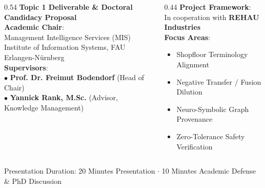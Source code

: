 \documentclass[aspectratio=169,10pt]{beamer}
\begin{document}
\begin{frame}[plain]
  \begin{columns}[T]
    \begin{column}{0.54\textwidth}
      \footnotesize
      \textbf{Topic 1 Deliverable \& Doctoral Candidacy Proposal}\\[0.4ex]
      \textbf{Academic Chair}:\\
      Management Intelligence Services (MIS)\\
      Institute of Information Systems, FAU Erlangen-N{\"u}rnberg\\[0.4ex]
      \textbf{Supervisors}:\\
      $\bullet$ \textbf{Prof. Dr. Freimut Bodendorf} (Head of Chair)\\
      $\bullet$ \textbf{Yannick Rank, M.Sc.} (Advisor, Knowledge Management)
    \end{column}
    \begin{column}{0.44\textwidth}
      \footnotesize
      \textbf{Project Framework}:\\
      In cooperation with \textbf{REHAU Industries}\\[0.4ex]
      \textbf{Focus Areas}:
      \begin{itemize}\setlength\itemsep{0.05ex}
        \item Shopfloor Terminology Alignment
        \item Negative Transfer / Fusion Dilution
        \item Neuro-Symbolic Graph Provenance
        \item Zero-Tolerance Safety Verification
      \end{itemize}
    \end{column}
  \end{columns}

  \vfill
  \centering
  \scriptsize\color{NeutralMuted}Presentation Duration: 20 Minutes Presentation $\cdot$ 10 Minutes Academic Defense \& PhD Discussion
\end{frame}
\end{document}
